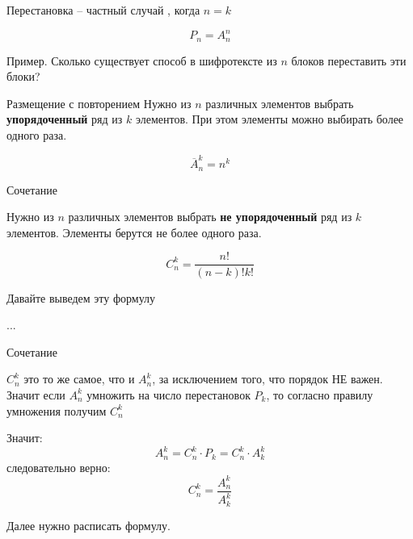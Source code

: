 \begin{frame}{Перестановка}
 -- 
частный случай , 
когда $n=k$ 

\begin{equation}
P_n = A_n^n
\end{equation}

Пример. Сколько существует способ в шифротексте из $n$ блоков переставить эти блоки?
\end{frame}


\begin{frame}{Размещение с повторением}
Нужно из
$n$
различных элементов 
выбрать \textbf{упорядоченный}
ряд из $k$
элементов. 
При этом элементы можно выбирать более одного раза.

\begin{equation}
\overline{A}_n^k = n ^ k
\end{equation} 

\end{frame}

\begin{frame}{Сочетание}
	
Нужно из
$n$
различных элементов 
выбрать \textbf{не упорядоченный}
ряд из $k$
элементов. 
Элементы берутся не более одного раза.

\begin{equation}
C_n^k = \frac{n!}{\left( n-k\right)! k!}
\end{equation}

Давайте выведем эту формулу

...
\end{frame}

\begin{frame}{Сочетание}

$C_n^k$ это то же самое, 
что и $A_n^k$, за исключением того, что порядок НЕ важен.
Значит если  $A_n^k$ умножить на число перестановок $P_k$,
то согласно правилу умножения получим $C_n^k$

Значит:
\begin{equation*}
A_n^k = C_n^k \cdot P_k = C_n^k \cdot A_k^k
\end{equation*}
следовательно верно:
\begin{equation*}
C_n^k = \frac{A_n^k}{A_k^k}
\end{equation*}

Далее нужно расписать формулу. 

\end{frame}

